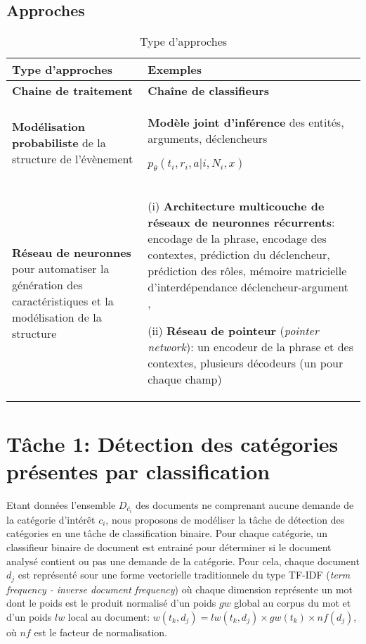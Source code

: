 \subsection{Approches}
\begin{table}[h!]
\small
\begin{tabular}{|p{}|p{}|}
\hline
\textbf{Type d'approches} & \textbf{Exemples} \\ \hline
\textbf{Chaine de traitement} & \textbf{Chaîne de classifieurs  }\cite{ahn2006stages} \\ \hline
\textbf{Modélisation probabiliste} de la structure de l'évènement & \textbf{Modèle joint d'inférence} des entités, arguments, déclencheurs

$p_\theta(t_i, r_i, a \vert i, N_i, x)$ \cite{yang2016jointEntityEvt} %
\\ \hline
\textbf{Réseau de neuronnes} pour automatiser la génération des caractéristiques et la modélisation de la structure & (i) \textbf{Architecture multicouche de réseaux de neuronnes récurrents}: encodage de la phrase, encodage des contextes, prédiction du déclencheur, prédiction des rôles, mémoire matricielle d'interdépendance déclencheur-argument \cite{nguyen2016jointtrgarg},  

(ii) \textbf{Réseau de pointeur} (\textit{pointer network}): un encodeur de la phrase et des contextes, plusieurs décodeurs (un pour chaque champ) \cite{palm2017e2e-dnn} \\ \hline
\end{tabular}
\caption{Type d'approches}
\end{table}


\section{Tâche 1: Détection des catégories présentes par classification}
Etant données l'ensemble $D_{\overline{c_i}}$ des documents ne comprenant aucune demande de la catégorie d'intérêt $c_i$, nous proposons de modéliser la tâche de détection des catégories en une tâche de classification binaire. Pour chaque catégorie, un classifieur binaire de document est entrainé pour déterminer si le document analysé contient ou pas une demande de la catégorie. Pour cela, chaque document $d_j$ est représenté sour une forme vectorielle traditionnele du type TF-IDF (\textit{term frequency - inverse document frequency}) où chaque dimension représente un mot dont le poids est le produit normalisé d'un poids $gw$ global au corpus du mot et d'un poids $lw$ local au document: $w(t_k, d_j) = lw(t_k, d_j) \times gw(t_k) \times nf(d_j)$, où $nf$ est le facteur de normalisation. 

